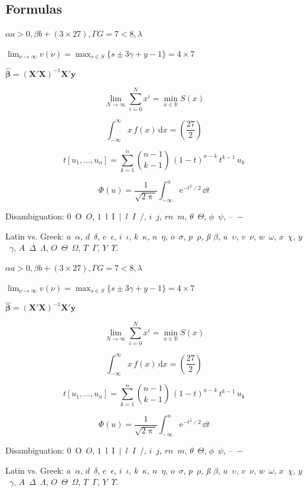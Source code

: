 	\subsection{Formulas \showfamily}

	\setlength{\parindent}{0pt}

	\noindent%
	\checkgreekletters

	\noindent%
	{\boldmath\checkgreekletters}

	\noindent%
	{\checkgreeklettersup}

	\noindent%
	{\boldmath \checkgreeklettersup}

	\noindent%
	$\alpha a > 0, \beta b + (3 \times 27), \Gamma G = 7 < 8, \lambda$

	$\lim_{\nu \to \infty} v(\nu) = \max_{s \in S} \{s \pm 3 \gamma + y - 1\} = 4 \times 7$

	$\hat{\bm{\beta}} = (\bm{X}'\bm{X})^{-1}\bm{X}'\bm{y}$

	$$\lim_{N \to \infty} \sum_{i=0}^{N} x^i = \min_{x \in \mathbb{R}} S(x)$$

	$$\int_{-\infty}^{\infty} x\,f(x)\,\mathup{d}x = \left( \frac{27}{2} \right)$$

	$$t[u_1, \dots, u_n] = \sum_{k=1}^n \binom{n - 1}{k - 1} \, (1 - t)^{n-k} \, t^{k-1} \, u_k$$

	$$\Phi(u) = \frac{1}{\sqrt{2\uppi}} \int_{-\infty}^u \mathrm{e}^{-t^2 \divslash 2} \, \dd t$$

	Disambiguation: $0$~O~$O$, $1$~l~I~$|$~$l$~$I$~$/$, $i$~$j$, $rn$~$m$, $\theta$~$\Theta$, $\phi$~$\psi$, --~$-$

	Latin vs. Greek: $a$~$\alpha$, $d$~$\delta$, $e$~$\epsilon$, $i$~$\iota$, $k$~$\kappa$, $n$~$\eta$, $o$~$\sigma$, $p$~$\rho$, \textit{\ss} $\beta$, $u$~$\upsilon$, $v$~$\nu$, $w$~$\omega$, $x$~$\chi$, $y$~$\gamma$, $A$~$\Delta$~$\Lambda$, $O$~$\Theta$~$\Omega$, $T$~$\Gamma$, $Y$~$\Upsilon$.

	\noindent%
	{\bfseries\boldmath%
		$\alpha a > 0, \beta b + (3 \times 27), \Gamma G = 7 < 8, \lambda$

		$\lim_{\nu \to \infty} v(\nu) = \max_{s \in S} \{s \pm 3 \gamma + y - 1\} = 4 \times 7$

		$\hat{\bm{\beta}} = (\bm{X}'\bm{X})^{-1}\bm{X}'\bm{y}$

		$$\lim_{N \to \infty} \sum_{i=0}^{N} x^i = \min_{x \in \mathbb{R}} S(x)$$

		$$\int_{-\infty}^{\infty} x\,f(x)\,\mathup{d}x = \left( \frac{27}{2} \right)$$

		$$t[u_1, \dots, u_n] = \sum_{k=1}^n \binom{n - 1}{k - 1} \, (1 - t)^{n-k} \, t^{k-1} \, u_k$$

		$$\Phi(u) = \frac{1}{\sqrt{2\uppi}} \int_{-\infty}^u \mathrm{e}^{-t^2 \divslash 2} \, \dd t$$

		Disambiguation: $0$~O~$O$, $1$~l~I~$|$~$l$~$I$~$/$, $i$~$j$, $rn$~$m$, $\theta$~$\Theta$, $\phi$~$\psi$, --~$-$

		Latin vs. Greek: $a$~$\alpha$, $d$~$\delta$, $e$~$\epsilon$, $i$~$\iota$, $k$~$\kappa$, $n$~$\eta$, $o$~$\sigma$, $p$~$\rho$, \textit{\ss} $\beta$, $u$~$\upsilon$, $v$~$\nu$, $w$~$\omega$, $x$~$\chi$, $y$~$\gamma$, $A$~$\Delta$~$\Lambda$, $O$~$\Theta$~$\Omega$, $T$~$\Gamma$, $Y$~$\Upsilon$.
	}

